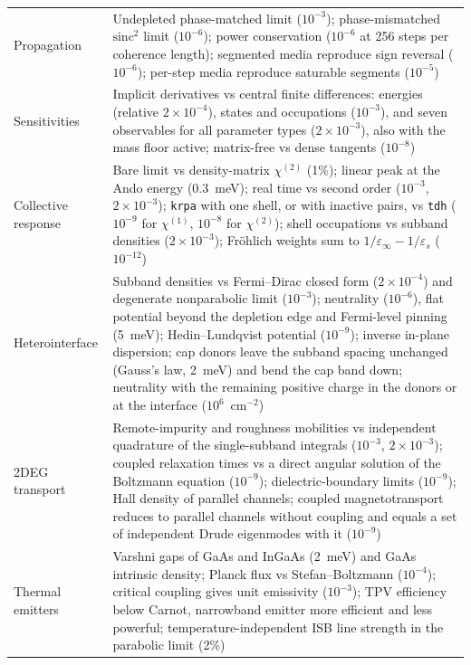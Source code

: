 \documentclass[11pt]{article}
\newcommand{\chitwo}{\chi^{(2)}}
\newcommand{\code}[1]{\texttt{#1}}
\begin{document}
\begin{table}[tp]
\begin{tabularx}{\textwidth}{@{}lX@{}}
Propagation & Undepleted phase-matched limit ($10^{-3}$); phase-mismatched $\mathrm{sinc}^2$ limit ($10^{-6}$); power conservation ($10^{-6}$ at 256 steps per coherence length); segmented media reproduce sign reversal ($10^{-6}$); per-step media reproduce saturable segments ($10^{-5}$) \\
Sensitivities & Implicit derivatives vs central finite differences: energies (relative $2\times10^{-4}$), states and occupations ($10^{-3}$), and seven observables for all parameter types ($2\times10^{-3}$), also with the mass floor active; matrix-free vs dense tangents ($10^{-8}$) \\
Collective response & Bare limit vs density-matrix $\chitwo$ (1\%); linear peak at the Ando energy (0.3~meV); real time vs second order ($10^{-3}$, $2\times10^{-3}$); \code{krpa} with one shell, or with inactive pairs, vs \code{tdh} ($10^{-9}$ for $\chi^{(1)}$, $10^{-8}$ for $\chitwo$); shell occupations vs subband densities ($2\times10^{-3}$); Fr\"ohlich weights sum to $1/\varepsilon_\infty-1/\varepsilon_s$ ($10^{-12}$) \\
Heterointerface & Subband densities vs Fermi--Dirac closed form ($2\times10^{-4}$) and degenerate nonparabolic limit ($10^{-3}$); neutrality ($10^{-6}$), flat potential beyond the depletion edge and Fermi-level pinning (5~meV); Hedin--Lundqvist potential ($10^{-9}$); inverse in-plane dispersion; cap donors leave the subband spacing unchanged (Gauss's law, 2~meV) and bend the cap band down; neutrality with the remaining positive charge in the donors or at the interface ($10^{6}$~cm$^{-2}$) \\
2DEG transport & Remote-impurity and roughness mobilities vs independent quadrature of the single-subband integrals ($10^{-3}$, $2\times10^{-3}$); coupled relaxation times vs a direct angular solution of the Boltzmann equation ($10^{-9}$); dielectric-boundary limits ($10^{-9}$); Hall density of parallel channels; coupled magnetotransport reduces to parallel channels without coupling and equals a set of independent Drude eigenmodes with it ($10^{-9}$) \\
Thermal emitters & Varshni gaps of GaAs and InGaAs (2~meV) and GaAs intrinsic density; Planck flux vs Stefan--Boltzmann ($10^{-4}$); critical coupling gives unit emissivity ($10^{-3}$); TPV efficiency below Carnot, narrowband emitter more efficient and less powerful; temperature-independent ISB line strength in the parabolic limit (2\%) \\ \bottomrule
\end{tabularx}
\end{table}
\end{document}
